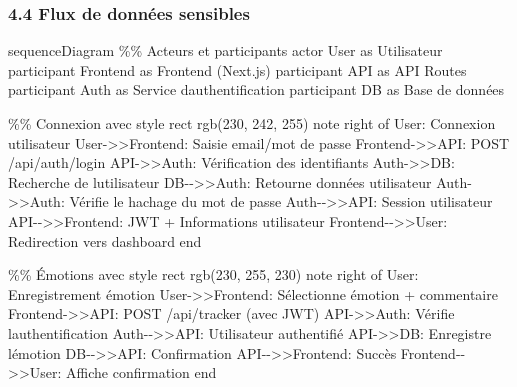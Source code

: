 \documentclass[
]{article}
\newenvironment{Shaded}{}{}
\newcommand{\NormalTok}[1]{#1}
\begin{document}
\subsubsection{4.4 Flux de données
sensibles}\label{flux-de-donnuxe9es-sensibles}

\begin{Shaded}
\begin{Highlighting}[]
\NormalTok{sequenceDiagram}
\NormalTok{    \%\% Acteurs et participants}
\NormalTok{    actor User as Utilisateur}
\NormalTok{    participant Frontend as Frontend (Next.js)}
\NormalTok{    participant API as API Routes}
\NormalTok{    participant Auth as Service d\textquotesingle{}authentification}
\NormalTok{    participant DB as Base de données}
    
\NormalTok{    \%\% Connexion avec style}
\NormalTok{    rect rgb(230, 242, 255)}
\NormalTok{    note right of User: Connexion utilisateur}
\NormalTok{    User{-}\textgreater{}\textgreater{}Frontend: Saisie email/mot de passe}
\NormalTok{    Frontend{-}\textgreater{}\textgreater{}API: POST /api/auth/login}
\NormalTok{    API{-}\textgreater{}\textgreater{}Auth: Vérification des identifiants}
\NormalTok{    Auth{-}\textgreater{}\textgreater{}DB: Recherche de l\textquotesingle{}utilisateur}
\NormalTok{    DB{-}{-}\textgreater{}\textgreater{}Auth: Retourne données utilisateur}
\NormalTok{    Auth{-}\textgreater{}\textgreater{}Auth: Vérifie le hachage du mot de passe}
\NormalTok{    Auth{-}{-}\textgreater{}\textgreater{}API: Session utilisateur}
\NormalTok{    API{-}{-}\textgreater{}\textgreater{}Frontend: JWT + Informations utilisateur}
\NormalTok{    Frontend{-}{-}\textgreater{}\textgreater{}User: Redirection vers dashboard}
\NormalTok{    end}
    
\NormalTok{    \%\% Émotions avec style}
\NormalTok{    rect rgb(230, 255, 230)}
\NormalTok{    note right of User: Enregistrement émotion}
\NormalTok{    User{-}\textgreater{}\textgreater{}Frontend: Sélectionne émotion + commentaire}
\NormalTok{    Frontend{-}\textgreater{}\textgreater{}API: POST /api/tracker (avec JWT)}
\NormalTok{    API{-}\textgreater{}\textgreater{}Auth: Vérifie l\textquotesingle{}authentification}
\NormalTok{    Auth{-}{-}\textgreater{}\textgreater{}API: Utilisateur authentifié}
\NormalTok{    API{-}\textgreater{}\textgreater{}DB: Enregistre l\textquotesingle{}émotion}
\NormalTok{    DB{-}{-}\textgreater{}\textgreater{}API: Confirmation}
\NormalTok{    API{-}{-}\textgreater{}\textgreater{}Frontend: Succès}
\NormalTok{    Frontend{-}{-}\textgreater{}\textgreater{}User: Affiche confirmation}
\NormalTok{    end}
\end{Highlighting}
\end{Shaded}
\end{document}
